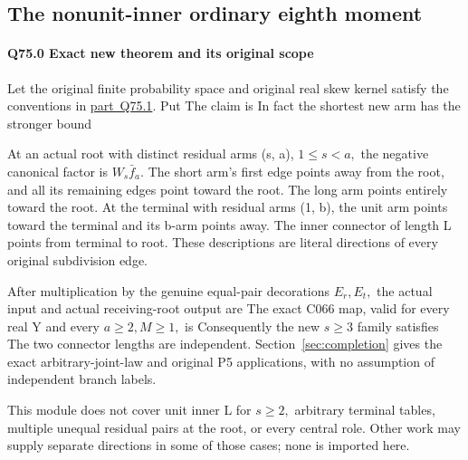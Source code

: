 \subsection{The nonunit-inner ordinary eighth moment}\label{proof:Q5-C075}
\paragraph{Q75.0 Exact new theorem and its original scope}

Let the original finite probability space and original real skew kernel satisfy
the conventions in \mbox{\hyperref[part:Q75.1]{part Q75.1}}. Put
The claim is
In fact the shortest new arm has the stronger bound


At an actual root with distinct residual arms (s, a), \(1\le s<a,\allowbreak \) the negative
canonical factor is \(W_s \bar f_a.\) The short arm's first edge points away from
the root, and all its remaining edges point toward the root. The long arm
points entirely toward the root. At the terminal with residual arms (1, b),
the unit arm points toward the terminal and its b-arm points away. The
inner connector of length L points from terminal to root. These descriptions
are literal directions of every original subdivision edge.

After multiplication by the genuine equal-pair decorations \(E_r,\allowbreak  E_t,\allowbreak \) the
actual input and actual receiving-root output are
The exact C066 map, valid for every real Y and every \(a\ge 2,\allowbreak  M\ge 1,\allowbreak \)
is
Consequently the new \(s\ge 3\) family satisfies
The two connector lengths are independent. Section~\ref{sec:completion} gives the exact
arbitrary-joint-law and original P5 applications, with no assumption of
independent branch labels.

This module does not cover unit inner L for \(s\ge 2,\allowbreak \) arbitrary terminal
tables, multiple unequal residual pairs at the root, or every central
role. Other work may supply separate directions in some of those cases;
none is imported here. 

